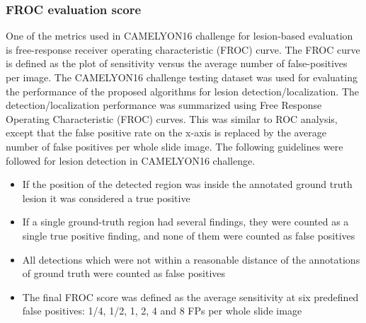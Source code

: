\documentclass[times,twocolumn,final,authoryear]{tmp}
\begin{document}
\subsubsection{FROC evaluation score}
\label{pth_sec:FROC}
One of the metrics used in CAMELYON16 challenge for lesion-based evaluation is free-response receiver operating characteristic (FROC) curve. The FROC curve is defined as the plot of sensitivity versus the average number of false-positives per image. The CAMELYON16 challenge testing dataset was used for evaluating the performance of the proposed algorithms for lesion detection/localization. The detection/localization performance was summarized using Free Response Operating Characteristic (FROC) curves. This was similar to ROC analysis, except that the false positive rate on the x-axis is replaced by the average number of false positives per whole slide image. The following guidelines were followed for lesion detection in CAMELYON16 challenge.
\begin{itemize}
    \item If the position of the detected region was inside the annotated ground truth lesion it was considered a true positive 
    
    \item If a single ground-truth region had several findings, they were counted as a single true positive finding, and none of them were counted as false positives 
    
    \item All detections which were not within a reasonable distance of the annotations of ground truth were counted as false positives
    
    \item The final FROC score was defined as the average sensitivity at six predefined false positives: 1/4, 1/2, 1, 2, 4 and 8 FPs per whole slide image 
\end{itemize}
\end{document}
